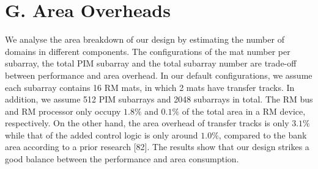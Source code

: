 \documentclass[10pt]{article}
\begin{document}
\section*{G. Area Overheads}
We analyse the area breakdown of our design by estimating the number of domains in different components. The configurations of the mat number per subarray, the total PIM subarray and the total subarray number are trade-off between performance and area overhead. In our default configurations, we assume each subarray contains 16 RM mats, in which 2 mats have transfer tracks. In addition, we assume 512 PIM subarrays and 2048 subarrays in total. The RM bus and RM processor only occupy $1.8 \%$ and $0.1 \%$ of the total area in a RM device, respectively. On the other hand, the area overhead of transfer tracks is only $3.1 \%$ while that of the added control logic is only around $1.0 \%$, compared to the bank area according to a prior research [82]. The results show that our design strikes a good balance between the performance and area consumption.
\end{document}
